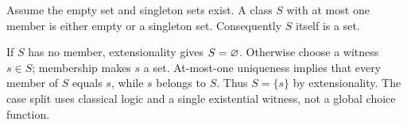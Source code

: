 \begin{lemma}
Assume the empty set and singleton sets exist. A class $S$ with at most one member is either
empty or a singleton set. Consequently $S$ itself is a set.
\end{lemma}
\Proof
If $S$ has no member, extensionality gives $S=\varnothing$. Otherwise
choose a witness $s\in S$; membership makes $s$ a set. At-most-one
uniqueness implies that every member of $S$ equals $s$, while $s$ belongs
to $S$. Thus $S=\{s\}$ by extensionality. The case split uses classical
logic and a single existential witness, not a global choice function.
\Done


